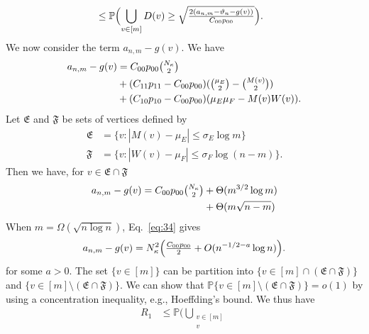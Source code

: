 \documentclass[10pt,journal,compsoc]{IEEEtran}
\theoremstyle{definition}
\begin{document}
\begin{IEEEproof}
\begin{IEEEproof}[Eq.~\eqref{eq:27}]
\begin{equation}
\begin{split}
    &\leq \mathbb{P}\Bigl(\bigcup_{v \in [m]} D(v) \geq
      \sqrt{\tfrac{2 (a_{n,m} - \vartheta_n -
        g(v))}{C_{00} p_{00}}} \Bigr).
  \end{split}
\end{equation}
We now consider the term $a_{n,m} - g(v)$. We have
\begin{equation*}
  \begin{split}
  a_{n,m} - g(v) &= C_{00} p_{00} \tbinom{N_\kappa}{2} \\ &+ (C_{11}p_{11} -
  C_{00} p_{00})(\tbinom{\mu_E}{2} - \tbinom{M(v)}{2})
  \\ &+ (C_{10} p_{10} - C_{00} p_{00})(\mu_E\mu_F - M(v)W(v)).
  \end{split}
\end{equation*}
Let $\mathfrak{E}$ and $\mathfrak{F}$ be sets of vertices defined by
\begin{align}
\mathfrak{E} &=
\{v \colon |M(v) - \mu_E| \leq \sigma_E \log{m}\} \\ \mathfrak{F} &=
\{v \colon |W(v) - \mu_F| \leq \sigma_F \log{(n-m)}\}.
\end{align}
Then we have, for $v \in \mathfrak{E} \cap \mathfrak{F}$
\begin{equation}
  \label{eq:34}
  \begin{split}
  a_{n,m} - g(v) =  C_{00} p_{00} \tbinom{N_\kappa}{2} &+
  \Theta(m^{3/2} \log{m}) \\ &+ 
  \Theta(m \sqrt{n - m}) \\
  \end{split}
\end{equation}
When $m = \Omega(\sqrt{n \log n})$, Eq.~\eqref{eq:34} gives
\begin{equation}
  \label{eq:35}
  a_{n,m} - g(v) = N_{\kappa}^{2}\Bigl(\tfrac{C_{00}p_{00}}{2} + O(n^{-1/2 - a}
  \log{n})\Bigr).
\end{equation}
for some $a > 0$. The set $\{v \in [m]\}$ can be partition into
$\{v \in [m] \cap (\mathfrak{E} \cap\mathfrak{F})\}$ and $\{v \in [m]
\setminus (\mathfrak{E} \cap \mathfrak{F})\}$. We can show that
$\mathbb{P}\{v \in [m] \setminus (\mathfrak{E} \cap \mathfrak{F})\} =
o(1)$ by using a concentration inequality, e.g., Hoeffding's
bound. We thus have
\begin{equation}
  \label{eq:37}
  \begin{split}
    R_1 &\leq \mathbb{P}\biggl( \bigcup_{\substack{v \in [m] \\ v
}}
\end{split}
\end{equation}
\end{IEEEproof}
\end{IEEEproof}
\end{document}
